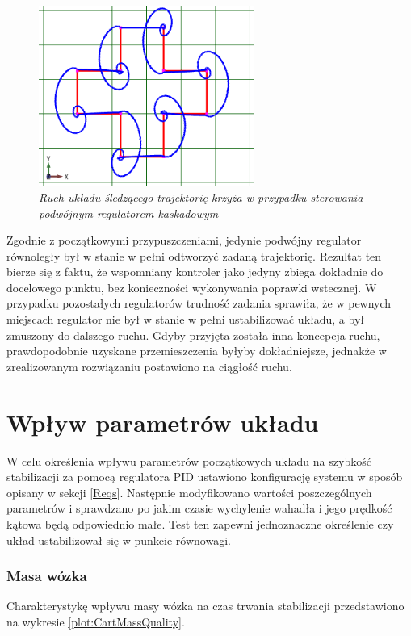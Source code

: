 \documentclass[12pt, oneside]{report}
\theoremstyle{definition}
\begin{document}
\begin{figure}[H]
	\centering
		\includegraphics[width = 200pt]{TrajectoryCrossCascade} 
		\caption{\textit{Ruch układu śledzącego trajektorię krzyża w przypadku sterowania podwójnym regulatorem kaskadowym}}
		\label{TrajectoryCrossCascade}
\end{figure}

Zgodnie z początkowymi przypuszczeniami, jedynie podwójny regulator równoległy był w stanie w pełni odtworzyć zadaną trajektorię. Rezultat ten bierze się z faktu, że wspomniany kontroler jako jedyny zbiega dokładnie do docelowego punktu, bez konieczności wykonywania poprawki wstecznej. W przypadku pozostałych regulatorów trudność zadania sprawiła, że w pewnych miejscach regulator nie był w stanie w pełni ustabilizować układu, a był zmuszony do dalszego ruchu. Gdyby przyjęta została inna koncepcja ruchu, prawdopodobnie uzyskane przemieszczenia byłyby dokładniejsze, jednakże w zrealizowanym rozwiązaniu postawiono na ciągłość ruchu.


\section{Wpływ parametrów układu}
W celu określenia wpływu parametrów początkowych układu na szybkość stabilizacji za pomocą regulatora PID ustawiono konfigurację systemu w sposób opisany w sekcji \ref{Reqs}. Następnie modyfikowano wartości poszczególnych parametrów i sprawdzano po jakim czasie wychylenie wahadła i jego prędkość kątowa będą odpowiednio małe. Test ten zapewni jednoznaczne określenie czy układ ustabilizował się w punkcie równowagi. 

\subsubsection{Masa wózka}
Charakterystykę wpływu masy wózka na czas trwania stabilizacji przedstawiono na wykresie \ref{plot:CartMassQuality}.
\end{document}
